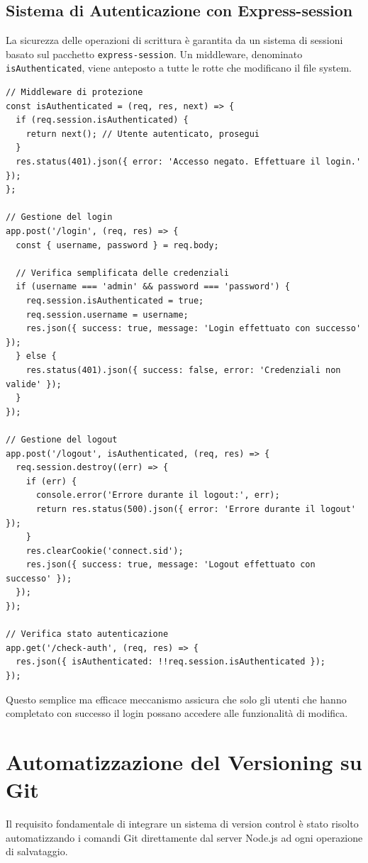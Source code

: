 \subsection{Sistema di Autenticazione con Express-session}
La sicurezza delle operazioni di scrittura è garantita da un sistema di sessioni basato sul pacchetto \texttt{express-session}. Un middleware, denominato \texttt{isAuthenticated}, viene anteposto a tutte le rotte che modificano il file system.

\begin{verbatim}
// Middleware di protezione
const isAuthenticated = (req, res, next) => {
  if (req.session.isAuthenticated) {
    return next(); // Utente autenticato, prosegui
  }
  res.status(401).json({ error: 'Accesso negato. Effettuare il login.' });
};

// Gestione del login
app.post('/login', (req, res) => {
  const { username, password } = req.body;
  
  // Verifica semplificata delle credenziali
  if (username === 'admin' && password === 'password') {
    req.session.isAuthenticated = true;
    req.session.username = username;
    res.json({ success: true, message: 'Login effettuato con successo' });
  } else {
    res.status(401).json({ success: false, error: 'Credenziali non valide' });
  }
});

// Gestione del logout
app.post('/logout', isAuthenticated, (req, res) => {
  req.session.destroy((err) => {
    if (err) {
      console.error('Errore durante il logout:', err);
      return res.status(500).json({ error: 'Errore durante il logout' });
    }
    res.clearCookie('connect.sid');
    res.json({ success: true, message: 'Logout effettuato con successo' });
  });
});

// Verifica stato autenticazione
app.get('/check-auth', (req, res) => {
  res.json({ isAuthenticated: !!req.session.isAuthenticated });
});
\end{verbatim}

Questo semplice ma efficace meccanismo assicura che solo gli utenti che hanno completato con successo il login possano accedere alle funzionalità di modifica.

\section{Automatizzazione del Versioning su Git}
Il requisito fondamentale di integrare un sistema di version control è stato risolto automatizzando i comandi Git direttamente dal server Node.js ad ogni operazione di salvataggio.

